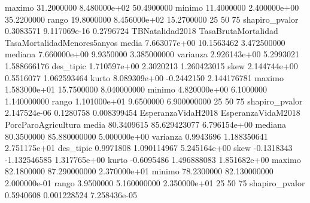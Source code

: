 \documentclass[11pt]{article}
\begin{document}
\begin{Schunk}
\begin{Soutput}
maximo                 31.2000000           8.480000e+02    50.4900000
minimo                 11.4000000           2.400000e+00    35.2200000
rango                  19.8000000           8.456000e+02    15.2700000
25%                    17.6750000           4.000000e+00    42.1025000
50%                    19.5000000           8.000000e+00    43.3350000
75%                    22.8000000           1.230000e+01    45.7000000
shapiro_pvalor          0.3083571           9.117069e-16     0.2796724
               TBNatalidad2018 TasaBrutaMortalidad TasaMortalidadMenores5anyos
media             7.663077e+00          10.1563462                 3.472500000
mediana           7.660000e+00           9.9350000                 3.385000000
varianza          2.926143e+00           5.2993021                 1.588666176
des_tipic         1.710597e+00           2.3020213                 1.260423015
skew              2.144744e+00           0.5516077                 1.062593464
kurto             8.089309e+00          -0.2442150                 2.144176781
maximo            1.583000e+01          15.7500000                 8.040000000
minimo            4.820000e+00           6.1000000                 1.140000000
rango             1.101000e+01           9.6500000                 6.900000000
25%               6.627500e+00           8.6200000                 2.672500000
50%               7.660000e+00           9.9350000                 3.385000000
75%               8.222500e+00          11.5775000                 4.145000000
shapiro_pvalor    2.147524e-06           0.1280758                 0.008399454
               EsperanzaVidaH2018 EsperanzaVidaM2018 PorcParoAgricultura
media                  80.3409615       85.629423077        6.796154e+00
mediana                80.3500000       85.880000000        5.000000e+00
varianza                0.9943696        1.188350641        2.751175e+01
des_tipic               0.9971808        1.090114967        5.245164e+00
skew                   -0.1318343       -1.132546585        1.317765e+00
kurto                  -0.6095486        1.496888083        1.851682e+00
maximo                 82.1800000       87.290000000        2.370000e+01
minimo                 78.2300000       82.130000000        2.000000e-01
rango                   3.9500000        5.160000000        2.350000e+01
25%                    79.6900000       85.137500000        3.425000e+00
50%                    80.3500000       85.880000000        5.000000e+00
75%                    80.9275000       86.302500000        9.975000e+00
shapiro_pvalor          0.5940608        0.001228524        7.258436e-05

\end{Soutput}
\end{Schunk}
\end{document}

